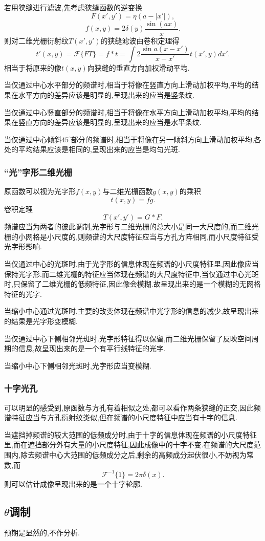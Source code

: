 \documentclass[10pt]{ctexart}
\begin{document}
若用狭缝进行滤波,先考虑狭缝函数的逆变换
$$F(x',y')=\eta(a-|x'|),$$
$$f(x,y)=2\delta(y)\frac{\sin{(ax)}}{x}.$$
则对二维光栅衍射纹$T(x',y')$的狭缝滤波由卷积定理得
$$t'(x,y)=\mathcal{F}\{FT\}=f*t=\int 2\frac{\sin{a(x-x')}}{x-x'}t(x',y)dx'.$$
相当于将原来的像$t(x,y)$向狭缝的垂直方向加权滑动平均.

当仅通过中心水平部分的频谱时,相当于将像在竖直方向上滑动加权平均,平均的结果在水平方向的差异应该是明显的,呈现出来的应当是竖条纹.

当仅通过中心竖直部分的频谱时,相当于将像在水平方向上滑动加权平均,平均的结果在竖直方向的差异应该是明显的,呈现出来的应当是水平条纹.

当仅通过中心倾斜$45^\circ$部分的频谱时,相当于将像在另一倾斜方向上滑动加权平均,各处的平均结果应该是相同的,呈现出来的应当是均匀光斑.
\subsubsection{“光”字形二维光栅}
原函数可以视为光字形$f(x,y)$与二维光栅函数$g(x,y)$的乘积
$$t(x,y)=fg.$$
卷积定理
$$T(x',y')=G*F.$$
频谱应当为两者的彼此调制,光字形与二维光栅的总大小是同一大尺度的,而二维光栅的小网格是小尺度的,则频谱的大尺度特征应当与方孔方阵相同,而小尺度特征受光字形影响.

当仅通过中心的光斑时.由于光字形的信息体现在频谱的小尺度特征里,因此像应当保持光字形.而二维光栅的特征应当体现在频谱的大尺度特征中,当仅通过中心光斑时,只保留了二维光栅的低频特征,因此像会模糊.故呈现出来的是一个模糊的无网格特征的光字.

当缩小中心通过光斑时,主要的改变体现在频谱中光字形的信息的减少,故呈现出来的结果是光字形变模糊.

当仅通过中心下侧相邻光斑时.光字形特征得以保留,而二维光栅保留了反映空间周期的信息,故呈现出来的是一个有平行线特征的光字.

当缩小中心下侧相邻光斑时,光字形应当变模糊.
\subsubsection{十字光孔}
可以明显的感受到,原函数与方孔有着相似之处,都可以看作两条狭缝的正交,因此频谱特征应当与方孔衍射纹类似,但在频谱的小尺度特征中应当有十字的信息.

当遮挡掉频谱的较大范围的低频成分时,由于十字的信息体现在频谱的小尺度特征里,而在遮挡部分外有大量的小尺度特征,因此成像中的十字不变.在频谱的大尺度范围内,除去频谱中心大范围的低频成分之后,剩余的高频成分起伏很小,不妨视为常数,而
$$\mathcal{F}^{-1}\{1\}=2\pi\delta(x).$$
则可以估计成像呈现出来的是一个十字轮廓.
\subsection{$\theta$调制}
预期是显然的,不作分析.
\end{document}
